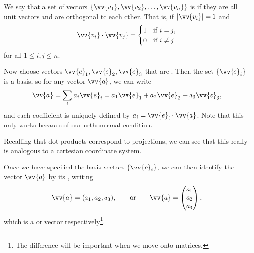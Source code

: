 \begin{definition}[Orthonormal]
    We say that a set of vectors $\{\vv{v_1}, \vv{v_2}, \dots, \vv{v_n} \}$ is  if they are all unit vectors and are orthogonal to each other. That is, if $|\vv{v_i}| = 1$ and
    $$
        \vv{v_i} \cdot \vv{v_j} = \begin{cases}
            1 &\mbox{if } i = j, \\
            0 &\mbox{if } i \neq j.
           \end{cases}
    $$
    for all $1 \leq i, j \leq n$.
\end{definition}

Now choose vectors $\vv{e}_1, \vv{e}_2, \vv{e}_3$ that are . Then the set $\{\vv{e}_i \}$ is a basis, so for any vector $\vv{a}$, we can write
$$
\vv{a} = \sum_{i} a_i \vv{e}_i = a_1 \vv{e}_1 + a_2 \vv{e}_2 + a_3 \vv{e}_3,
$$
and each coefficient is uniquely defined by $a_i = \vv{e}_i \cdot \vv{a}$. Note that this only works because of our orthonormal condition.

Recalling that dot products correspond to projections, we can see that this really is analogous to a cartesian coordinate system.

\begin{center}
\end{center}
Once we have specified the basis vectors $\{\vv{e}_i\}$, we can then identify the vector $\vv{a}$ by its , writing 
$$
\vv{a} = (a_1, a_2, a_3), \quad \quad \text{or} \quad \quad \vv{a} = \begin{pmatrix} a_1 \\ a_2 \\ a_3 \end{pmatrix},
$$
which is a  or  vector respectively\footnote{The difference will be important when we move onto matrices.}.

